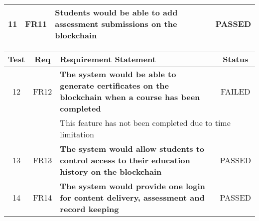 \begin{table}[!ht]
\begin{tabularx}{\textwidth}{|c|c|X|c|}
		\hline
		11                                                                & FR11                    & \textbf{Students would be able to add assessment submissions
		on the blockchain}                                                & \cellcolor{green}PASSED                                                                                                                                                                                   \\
		\hline
	\end{tabularx}
\end{table}
\clearpage
\begin{table}[!ht]
    \begin{tabularx}{\textwidth}{|c|c|X|c|}
        \hline
		Test                                                              & Req                     & Requirement Statement                                                                                                                                 & Status                  \\
        \hline
        12                                                                & FR12                    & \textbf{The system would be able to generate certificates on
		the blockchain when a course has been completed}                  & \cellcolor{pink}FAILED                                                                                                                                                                                    \\
        \hline
        &                         & \multicolumn{2}{X|}{This feature has not been completed due to time limitation}                                                                                                 \\
        \hline
		13                                                                & FR13                    & \textbf{The system would allow students to control access to
		their education history on the blockchain}                        & \cellcolor{green}PASSED                                                                                                                                                                                   \\
		\hline
		14 & FR14 & \textbf{The system would provide one login for content delivery, assessment and record keeping} & \cellcolor{green}PASSED \\

\end{tabularx}
\end{table}

